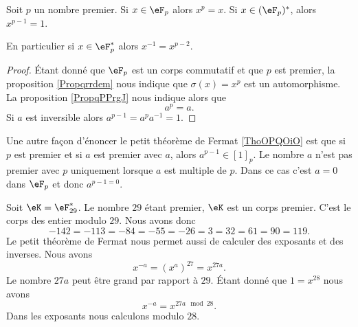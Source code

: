 \begin{theorem}       \label{ThoOPQOiO}   
    Soit \( p\) un nombre premier. Si \( x\in \eF_p\) alors \( x^p=x\). Si \( x\in(\eF_p)^*\), alors \( x^{p-1}=1\).

    En particulier si \( x\in \eF_p^*\) alors \( x^{-1}=x^{p-2}\).
\end{theorem}

\begin{proof}
    Étant donné que \( \eF_p\) est un corps commutatif et que \( p\) est premier, la proposition \ref{Propqrrdem} nous indique que \( \sigma(x)=x^p\) est un automorphisme. La proposition \ref{PropqPPrgJ} nous indique alors que
    \begin{equation}
        a^p=a.
    \end{equation}
    Si \( a\) est inversible alors \( a^{p-1}=a^pa^{-1}=1\).
\end{proof}

\begin{remark}      \label{RemCoSnxh}
    Une autre façon d'énoncer le petit théorème de Fermat \ref{ThoOPQOiO} est que si \( p\) est premier et si \( a\) est premier avec \( a\), alors \( a^{p-1}\in[1]_p\). Le nombre \( a\) n'est pas premier avec \( p\) uniquement lorsque \( a\) est multiple de \( p\). Dans ce cas c'est \( a=0\) dans \( \eF_p\) et donc \( a^{p-1=0}\).
\end{remark}

\begin{example}
    Soit \( \eK=\eF_{29}^*\). Le nombre \( 29\) étant premier, \( \eK\) est un corps premier. C'est le corps des entier modulo \( 29\). Nous avons donc
    \begin{equation}
            -142=-113=-84=-55=-26=3=32=61=90=119.
    \end{equation}
    Le petit théorème de Fermat nous permet aussi de calculer des exposants et des inverses. Nous avons
    \begin{equation}
        x^{-a}=(x^a)^{27}=x^{27a}.
    \end{equation}
    Le nombre \( 27 a\) peut être grand par rapport à \( 29\). Étant donné que \( 1=x^{28}\) nous avons
    \begin{equation}
        x^{-a}=x^{27 a\mod 28}.
    \end{equation}
    Dans les exposants nous calculons modulo \( 28\).
\end{example}

